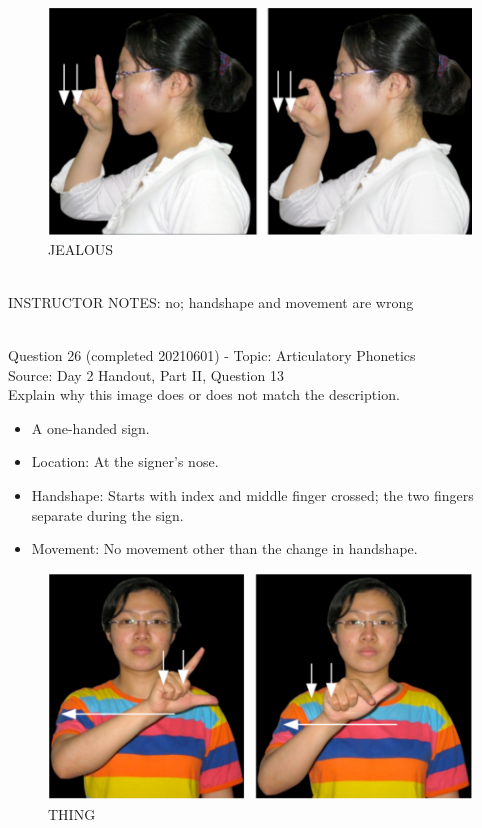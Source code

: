 \documentclass[12pt]{article}
\begin{document}
\begin{figure}[H]
\includegraphics{../images/taiwansign_jealous.png}
\caption{JEALOUS}
\end{figure}

~\\
INSTRUCTOR NOTES: no; handshape and movement are wrong


~\\

{\large Question 26} (completed 20210601) - Topic: Articulatory Phonetics\\
Source: Day 2 Handout, Part II, Question 13\\

Explain why this image does or does not match the description.\\

\begin{itemize} \item A one-handed sign. \item Location: At the signer’s nose. \item Handshape: Starts with index and middle finger crossed; the two fingers separate during the sign. \item Movement: No movement other than the change in handshape. \end{itemize}

\begin{figure}[H]
\includegraphics{../images/taiwansign_thing.png}
\caption{THING}
\end{figure}
\end{document}

